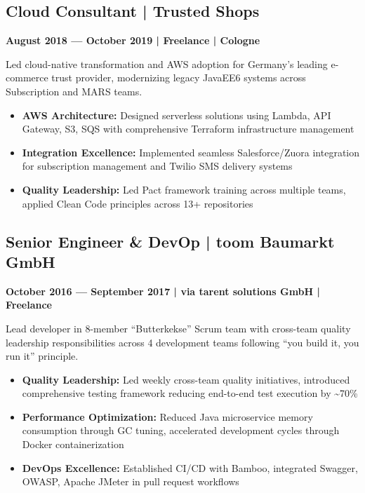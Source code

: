 \documentclass[11pt,a4paper]{article}
\begin{document}
\subsection{Cloud Consultant | Trusted Shops}
\textbf{August 2018 --- October 2019 | Freelance | Cologne}

Led cloud-native transformation and AWS adoption for Germany's leading e-commerce trust provider, modernizing legacy JavaEE6 systems across Subscription and MARS teams.

\begin{itemize}
\item \textbf{AWS Architecture:} Designed serverless solutions using Lambda, API Gateway, S3, SQS with comprehensive Terraform infrastructure management
\item \textbf{Integration Excellence:} Implemented seamless Salesforce/Zuora integration for subscription management and Twilio SMS delivery systems
\item \textbf{Quality Leadership:} Led Pact framework training across multiple teams, applied Clean Code principles across 13+ repositories
\end{itemize}

\vfill

\newpage

\subsection{Senior Engineer \& DevOp | toom Baumarkt GmbH}
\textbf{October 2016 --- September 2017 | via tarent solutions GmbH | Freelance}

Lead developer in 8-member ``Butterkekse'' Scrum team with cross-team quality leadership responsibilities across 4 development teams following ``you build it, you run it'' principle.

\begin{itemize}
\item \textbf{Quality Leadership:} Led weekly cross-team quality initiatives, introduced comprehensive testing framework reducing end-to-end test execution by \textasciitilde{}70\%
\item \textbf{Performance Optimization:} Reduced Java microservice memory consumption through GC tuning, accelerated development cycles through Docker containerization
\item \textbf{DevOps Excellence:} Established CI/CD with Bamboo, integrated Swagger, OWASP, Apache JMeter in pull request workflows
\end{itemize}
\end{document}
